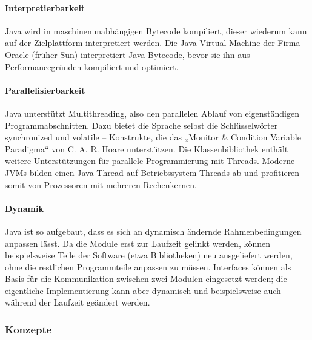 \paragraph{Interpretierbarkeit}
Java wird in maschinenunabhängigen Bytecode kompiliert, dieser wiederum kann auf der Zielplattform interpretiert werden. Die Java Virtual Machine der Firma Oracle (früher Sun) interpretiert Java-Bytecode, bevor sie ihn aus Performancegründen kompiliert und optimiert.

\paragraph{Parallelisierbarkeit}
Java unterstützt Multithreading, also den parallelen Ablauf von eigenständigen Programmabschnitten. Dazu bietet die Sprache selbst die Schlüsselwörter synchronized und volatile – Konstrukte, die das „Monitor \& Condition Variable Paradigma“ von C. A. R. Hoare unterstützen. Die Klassenbibliothek enthält weitere Unterstützungen für parallele Programmierung mit Threads. Moderne JVMs bilden einen Java-Thread auf Betriebssystem-Threads ab und profitieren somit von Prozessoren mit mehreren Rechenkernen.

\paragraph{Dynamik}
Java ist so aufgebaut, dass es sich an dynamisch ändernde Rahmenbedingungen anpassen lässt. Da die Module erst zur Laufzeit gelinkt werden, können beispielsweise Teile der Software (etwa Bibliotheken) neu ausgeliefert werden, ohne die restlichen Programmteile anpassen zu müssen. Interfaces können als Basis für die Kommunikation zwischen zwei Modulen eingesetzt werden; die eigentliche Implementierung kann aber dynamisch und beispielsweise auch während der Laufzeit geändert werden. 

\subsubsection{Konzepte}

